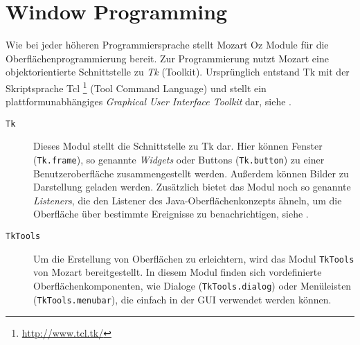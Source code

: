 \section{Window Programming}

Wie bei jeder höheren Programmiersprache stellt Mozart Oz Module für die
Oberflächenprogrammierung bereit. Zur Programmierung nutzt Mozart eine
objektorientierte Schnittstelle zu \textsl{Tk} (Toolkit). Ursprünglich entstand
Tk mit der Skriptsprache Tcl \footnote{\url{http://www.tcl.tk/}} (Tool Command
Language) und stellt ein plattformunabhängiges \textsl{Graphical User Interface
Toolkit} dar, siehe \cite{url:tcl-tk}.  

\begin{description}
  \item[\texttt{Tk}] Dieses Modul stellt die Schnittstelle zu Tk dar. Hier
  können Fenster (\texttt{Tk.frame}), so genannte \textsl{Widgets} oder Buttons
  (\texttt{Tk.button}) zu einer Benutzeroberfläche zusammengestellt werden.
  Außerdem können Bilder zu Darstellung geladen werden. Zusätzlich bietet das Modul
  noch so genannte \textsl{Listeners}, die den Listener des  
  Java-Oberflächenkonzepts ähneln, um die Oberfläche über bestimmte Ereignisse
  zu benachrichtigen, siehe \cite[System Modules, Part VI]{url:mozart-documentation}. 
  
  \item[\texttt{TkTools}] Um die Erstellung von Oberflächen zu erleichtern, wird
  das Modul \texttt{TkTools} von Mozart bereitgestellt. In diesem Modul finden
  sich vordefinierte Oberflächenkomponenten, wie Dialoge
  (\texttt{TkTools.dialog}) oder Menüleisten (\texttt{TkTools.menubar}), die
  einfach in der GUI verwendet werden können.
\end{description}

